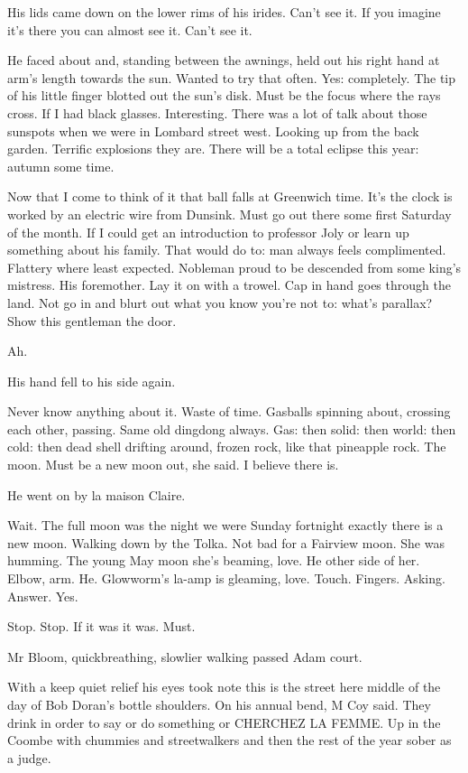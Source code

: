 His lids came down on the lower rims of his irides. Can't see it. If you
imagine it's there you can almost see it. Can't see it.

He faced about and, standing between the awnings, held out his right
hand at arm's length towards the sun. Wanted to try that often. Yes:
completely. The tip of his little finger blotted out the sun's disk. Must
be the focus where the rays cross. If I had black glasses. Interesting.
There was a lot of talk about those sunspots when we were in Lombard
street west. Looking up from the back garden. Terrific explosions they
are. There will be a total eclipse this year: autumn some time.

Now that I come to think of it that ball falls at Greenwich time. It's
the clock is worked by an electric wire from Dunsink. Must go out there
some first Saturday of the month. If I could get an introduction to
professor Joly or learn up something about his family. That would do to:
man always feels complimented. Flattery where least expected. Nobleman
proud to be descended from some king's mistress. His foremother. Lay it on
with a trowel. Cap in hand goes through the land. Not go in and blurt out
what you know you're not to: what's parallax? Show this gentleman the
door.

Ah.

His hand fell to his side again.

Never know anything about it. Waste of time. Gasballs spinning
about, crossing each other, passing. Same old dingdong always. Gas: then
solid: then world: then cold: then dead shell drifting around, frozen
rock, like that pineapple rock. The moon. Must be a new moon out, she
said. I believe there is.

He went on by la maison Claire.

Wait. The full moon was the night we were Sunday fortnight exactly
there is a new moon. Walking down by the Tolka. Not bad for a Fairview
moon. She was humming. The young May moon she's beaming, love. He
other side of her. Elbow, arm. He. Glowworm's la-amp is gleaming, love.
Touch. Fingers. Asking. Answer. Yes.

Stop. Stop. If it was it was. Must.

Mr Bloom, quickbreathing, slowlier walking passed Adam court.

With a keep quiet relief his eyes took note this is the street here
middle of the day of Bob Doran's bottle shoulders. On his annual bend,
M Coy said. They drink in order to say or do something or CHERCHEZ LA
FEMME. Up in the Coombe with chummies and streetwalkers and then the
rest of the year sober as a judge.

